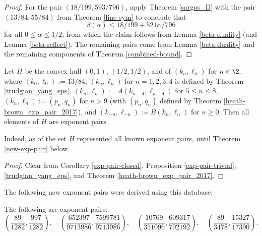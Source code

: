 \literature
{}

\begin{proof}  For the pair $(18/199, 593/796)$, apply Theorem \ref{sargos_D} with the pair $(13/84, 55/84)$ from Theorem \ref{line-sym} to conclude that
    $$ \beta(\alpha) \leq 18/199 + 521 \alpha / 796$$
    for all $0 \leq \alpha \leq 1/2$, from which the claim follows from Lemma \ref{beta-duality} (and Lemma \ref{beta-reflect}).
The remaining pairs come from Lemma \ref{beta-duality} and the remaining components of Theorem \ref{combined-bound}.
\end{proof}

\begin{corollary}\label{H-pairs}\cite[Theorem 1.3]{trudgian-yang}  Let $H$ be the convex hull $(0,1)$, $(1/2,1/2)$, and of $(k_n,\ell_n)$ for $n \in \Z$, where $(k_0,\ell_0) := 13/84$, $(k_n,\ell_n)$ for $n=1,2,3,4$ is defined by Theorem \ref{trudgian_yang_eps}, $(k_n,\ell_n) := A(k_{n-4},\ell_{n-4})$ for $5 \leq n \leq 8$, $(k_n,\ell_n) := (p_n,q_n)$ for $n > 9$ (with $(p_n,q_n)$ defined by Theorem \ref{heath-brown_exp_pair_2017}), and $(k_{-n},\ell_{-n}) := B(k_n,\ell_n)$ for $n \geq 0$.  Then all elements of $H$ are exponent pairs.
\end{corollary}

Indeed, as of \cite{trudgian-yang} the set $H$ represented all known exponent pairs, until Theorem \ref{new-exp-pair} below.

\begin{proof} Clear from Corollary \ref{exp-pair-closed}, Proposition \ref{exp-pair-trivial}, \ref{trudgian_yang_eps}, and Theorem \ref{heath-brown_exp_pair_2017}.
\end{proof}

The following new exponent pairs were derived using this database:

\begin{theorem}\label{new-exp-pair} The following are exponent pairs:
\[
\left(\frac{89}{1282}, \frac{997}{1282}\right),\quad \left(\frac{652397}{9713986}, \frac{7599781}{9713986}\right),\quad \left(\frac{10769}{351096}, \frac{609317}{702192}\right),\quad \left(\frac{89}{3478}, \frac{15327}{17390}\right).
\]
\end{theorem}
\derived
{}

